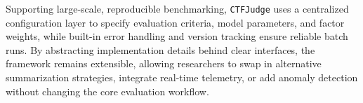 Supporting large-scale, reproducible benchmarking, \texttt{CTFJudge} uses a centralized configuration layer to specify evaluation criteria, model parameters, and factor weights, while built-in error handling and version tracking ensure reliable batch runs. By abstracting implementation details behind clear interfaces, the framework remains extensible, allowing researchers to swap in alternative summarization strategies, integrate real-time telemetry, or add anomaly detection without changing the core evaluation workflow.






